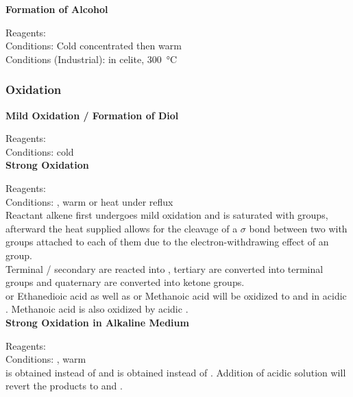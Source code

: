 \documentclass[../main]{subfiles}
\begin{document}
	\noindent \textbf{Formation of Alcohol}

	Reagents:  \\
	Conditions: Cold concentrated  then warm  \\
	Conditions (Industrial):  in celite, \SI{300}{\celsius} \\

	\subsubsection{Oxidation}

	\noindent \textbf{Mild Oxidation / Formation of Diol}

	Reagents: \\
	Conditions:  cold \\

	\noindent \textbf{Strong Oxidation}

	Reagents: \\
	Conditions: , warm or heat under reflux \\

	Reactant alkene first undergoes mild oxidation and is saturated with  groups, afterward the heat supplied allows for the cleavage of a \(\sigma\) bond between two  with  groups attached to each of them due to the electron-withdrawing effect of an  group. \\

	Terminal / secondary  are reacted into , tertiary  are converted into terminal  groups and quaternary  are converted into ketone groups. \\

	 or Ethanedioic acid as well as  or Methanoic acid will be oxidized to  and  in acidic . Methanoic acid is also oxidized by acidic . \\

	\noindent \textbf{Strong Oxidation in Alkaline Medium}

	Reagents:  \\
	Conditions: , warm \\

	 is obtained instead of  and  is obtained instead of . Addition of acidic solution will revert the products to  and . \\
\end{document}
